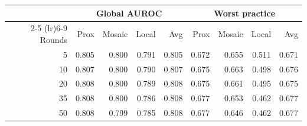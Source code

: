 \setlength{\tabcolsep}{4.5pt}\small
\begin{tabular}{rrrrrrrrr}
    \toprule
    & \multicolumn{4}{c}{Global AUROC} & \multicolumn{4}{c}{Worst practice} \\
    \cmidrule(lr){2-5} \cmidrule(lr){6-9}
    Rounds & Prox & Mosaic & Local & Avg & Prox & Mosaic & Local & Avg \\
    \midrule
    5 & 0.805 & 0.800 & 0.791 & 0.805 & 0.672 & 0.655 & 0.511 & 0.671 \\
    10 & 0.807 & 0.800 & 0.790 & 0.807 & 0.675 & 0.663 & 0.498 & 0.676 \\
    20 & 0.808 & 0.800 & 0.789 & 0.808 & 0.675 & 0.661 & 0.495 & 0.675 \\
    35 & 0.808 & 0.800 & 0.786 & 0.808 & 0.677 & 0.653 & 0.462 & 0.677 \\
    50 & 0.808 & 0.799 & 0.785 & 0.808 & 0.677 & 0.646 & 0.462 & 0.677 \\
    \bottomrule
\end{tabular}
